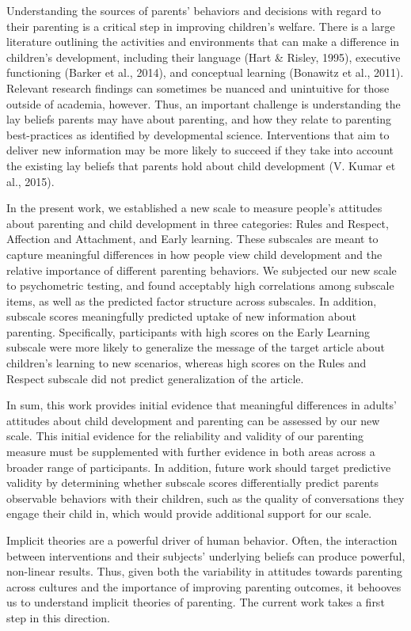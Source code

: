 \documentclass[10pt, letterpaper]{article}
\begin{document}
Understanding the sources of parents' behaviors and decisions with
regard to their parenting is a critical step in improving children's
welfare. There is a large literature outlining the activities and
environments that can make a difference in children's development,
including their language (Hart \& Risley, 1995), executive functioning
(Barker et al., 2014), and conceptual learning (Bonawitz et al., 2011).
Relevant research findings can sometimes be nuanced and unintuitive for
those outside of academia, however. Thus, an important challenge is
understanding the lay beliefs parents may have about parenting, and how
they relate to parenting best-practices as identified by developmental
science. Interventions that aim to deliver new information may be more
likely to succeed if they take into account the existing lay beliefs
that parents hold about child development (V. Kumar et al., 2015).

In the present work, we established a new scale to measure people's
attitudes about parenting and child development in three categories:
Rules and Respect, Affection and Attachment, and Early learning. These
subscales are meant to capture meaningful differences in how people view
child development and the relative importance of different parenting
behaviors. We subjected our new scale to psychometric testing, and found
acceptably high correlations among subscale items, as well as the
predicted factor structure across subscales. In addition, subscale
scores meaningfully predicted uptake of new information about parenting.
Specifically, participants with high scores on the Early Learning
subscale were more likely to generalize the message of the target
article about children's learning to new scenarios, whereas high scores
on the Rules and Respect subscale did not predict generalization of the
article.

In sum, this work provides initial evidence that meaningful differences
in adults' attitudes about child development and parenting can be
assessed by our new scale. This initial evidence for the reliability and
validity of our parenting measure must be supplemented with further
evidence in both areas across a broader range of participants. In
addition, future work should target predictive validity by determining
whether subscale scores differentially predict parents observable
behaviors with their children, such as the quality of conversations they
engage their child in, which would provide additional support for our
scale.

Implicit theories are a powerful driver of human behavior. Often, the
interaction between interventions and their subjects' underlying beliefs
can produce powerful, non-linear results. Thus, given both the
variability in attitudes towards parenting across cultures and the
importance of improving parenting outcomes, it behooves us to understand
implicit theories of parenting. The current work takes a first step in
this direction.
\end{document}
